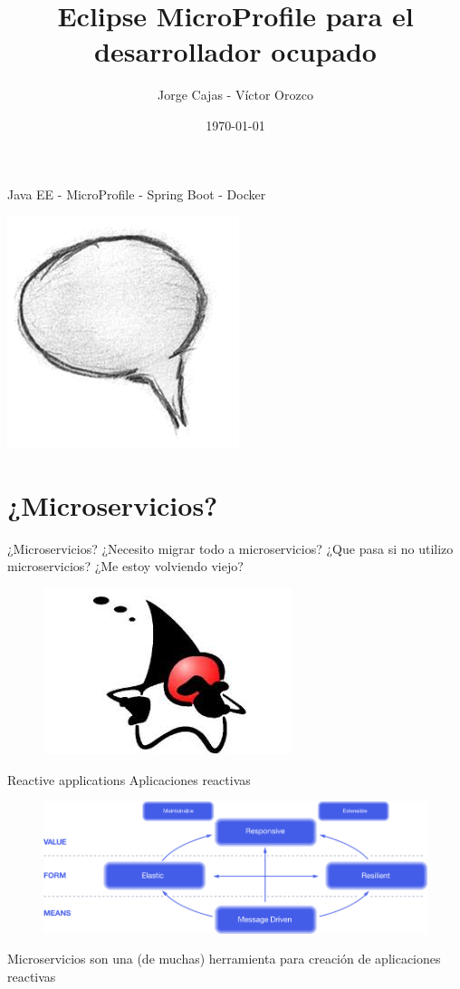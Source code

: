\documentclass{beamer}
\title{Eclipse MicroProfile para el desarrollador ocupado}
\author{Jorge Cajas - Víctor Orozco}
\institute{@cajasmota - @tuxtor}
\date{\today}
\begin{document}
\frame{\titlepage}

\begin{frame}{Java EE - MicroProfile - Spring Boot - Docker}
\begin{center}
	\includegraphics[width=0.4\linewidth]{Images/comment}
\end{center}
\end{frame}

\section{¿Microservicios?}
\begin{frame}{¿Microservicios?}
\Large ¿Necesito migrar todo a microservicios? ¿Que pasa si no utilizo microservicios? ¿Me estoy volviendo viejo?
\begin{figure}
	\centering
	\includegraphics[width=0.6\linewidth]{Images/dukewhy}
\end{figure}
\end{frame}

\begin{frame}{Reactive applications}
Aplicaciones reactivas
\begin{figure}
	\centering
	\includegraphics[width=\linewidth]{Images/reactive-traits}
\end{figure}
Microservicios son una (de muchas) herramienta para creación de aplicaciones reactivas
\end{frame}
\end{document}
